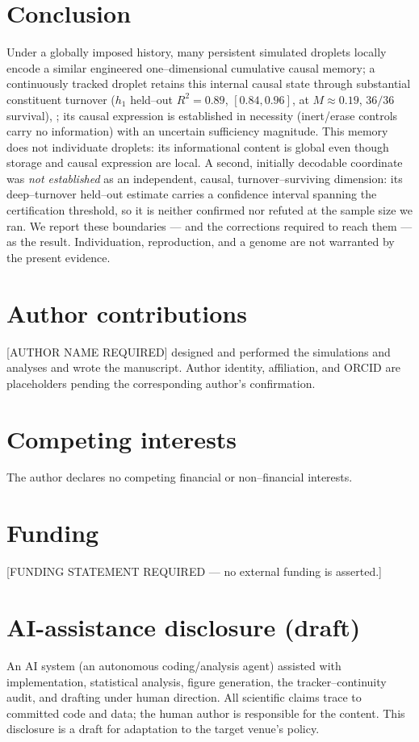 \documentclass[11pt]{article}
\begin{document}
\section{Conclusion}
Under a globally imposed history, many persistent simulated droplets locally encode a similar engineered
one--dimensional cumulative causal memory; a continuously tracked droplet retains this internal causal state through
substantial constituent turnover ($h_1$ held--out $R^2=0.89$, $[0.84,0.96]$, at $M\approx0.19$, $36/36$ survival),
; its causal expression is established in necessity (inert/erase controls carry no information) with an uncertain sufficiency magnitude. This memory does not individuate droplets: its informational content
is global even though storage and causal expression are local. A second, initially decodable coordinate was \emph{not established} as an independent, causal, turnover--surviving dimension: its deep--turnover held--out estimate carries a confidence interval spanning the certification threshold, so it is neither confirmed nor refuted at the sample size we ran.
We report these boundaries --- and the corrections required to reach them --- as the result. Individuation,
reproduction, and a genome are not warranted by the present evidence.

\section*{Author contributions}
[AUTHOR NAME REQUIRED] designed and performed the simulations and analyses and wrote the manuscript. Author
identity, affiliation, and ORCID are placeholders pending the corresponding author's confirmation.

\section*{Competing interests}
The author declares no competing financial or non--financial interests.

\section*{Funding}
[FUNDING STATEMENT REQUIRED --- no external funding is asserted.]

\section*{AI-assistance disclosure (draft)}
An AI system (an autonomous coding/analysis agent) assisted with implementation, statistical analysis, figure
generation, the tracker--continuity audit, and drafting under human direction. All scientific claims trace to
committed code and data; the human author is responsible for the content. This disclosure is a draft for adaptation
to the target venue's policy.
\end{document}
